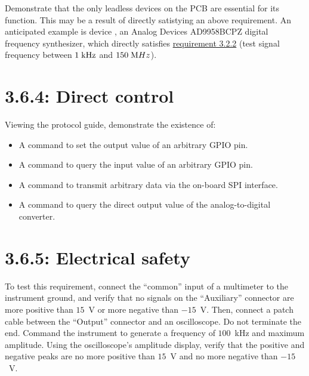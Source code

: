 Demonstrate that the only leadless devices on the PCB are essential for its function. This may be
a result of directly satistying an above requirement. An anticipated example is device ,
an Analog Devices AD9958BCPZ digital frequency synthesizer, which directly satisfies
\hyperref[tp:3.2.2]{requirement 3.2.2} (test signal frequency between $1\;\mathrm{kHz}$ and $150\;\mathrm{M}Hz$).

\section*{3.6.4: Direct control}
Viewing the protocol guide, demonstrate the existence of:

\begin{itemize}
\item{A command to set the output value of an arbitrary GPIO pin.}
\item{A command to query the input value of an arbitrary GPIO pin.}
\item{A command to transmit arbitrary data via the on-board SPI interface.}
\item{A command to query the direct output value of the analog-to-digital converter.}
\end{itemize}

\section*{3.6.5: Electrical safety}
To test this requirement, connect the ``common'' input of a multimeter to the instrument ground, and
verify that no signals on the ``Auxiliary'' connector are more positive than $15$~V or more negative than $-15$~V.
Then, connect a patch cable between the ``Output'' connector and an oscilloscope. Do not terminate the end. Command
the instrument to generate a frequency of $100$~kHz and maximum amplitude. Using the oscilloscope's amplitude display,
verify that the positive and negative peaks are no more positive than $15$~V and no more negative than
$-15$~V.
